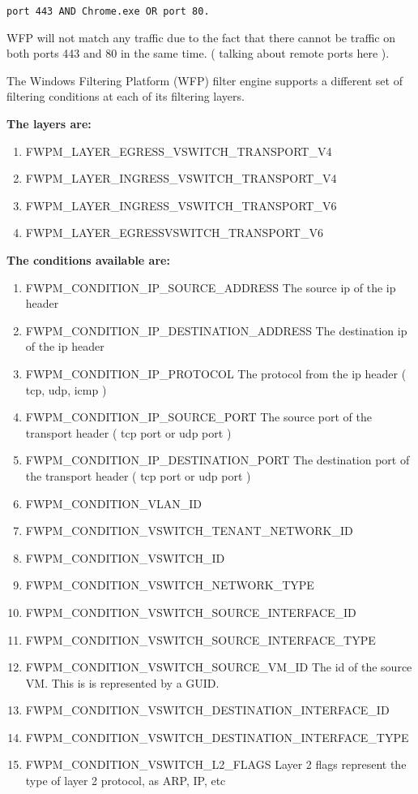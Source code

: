 \begin{lstlisting}
port 443 AND Chrome.exe OR port 80.
\end{lstlisting}

\vspace{5mm}
WFP will not match any traffic due to the fact that there cannot be traffic on both ports 443 and 80 in the same time. ( talking about remote ports here ).
\vspace{5mm}

The Windows Filtering Platform (WFP) filter engine supports a different set of filtering conditions at each of its filtering layers.

\vspace{5mm}

\textbf{The layers are: }
\vspace{5mm}
\begin{enumerate}
\item FWPM\_LAYER\_EGRESS\_VSWITCH\_TRANSPORT\_V4
\item FWPM\_LAYER\_INGRESS\_VSWITCH\_TRANSPORT\_V4
\item FWPM\_LAYER\_INGRESS\_VSWITCH\_TRANSPORT\_V6
\item FWPM\_LAYER\_EGRESSVSWITCH\_TRANSPORT\_V6
\end{enumerate}
\vspace{5mm}
\textbf{The conditions available are:}
\vspace{5mm}
\begin{enumerate}
\item FWPM\_CONDITION\_IP\_SOURCE\_ADDRESS
The source ip of the ip header
\item FWPM\_CONDITION\_IP\_DESTINATION\_ADDRESS
The destination ip of the ip header
\item FWPM\_CONDITION\_IP\_PROTOCOL
The protocol from the ip header ( tcp, udp, icmp )
\item FWPM\_CONDITION\_IP\_SOURCE\_PORT
The source port of the transport header ( tcp port or udp port )
\item FWPM\_CONDITION\_IP\_DESTINATION\_PORT
The destination port of the transport header ( tcp port or udp port )
\item FWPM\_CONDITION\_VLAN\_ID
\item FWPM\_CONDITION\_VSWITCH\_TENANT\_NETWORK\_ID
\item FWPM\_CONDITION\_VSWITCH\_ID
\item FWPM\_CONDITION\_VSWITCH\_NETWORK\_TYPE
\item FWPM\_CONDITION\_VSWITCH\_SOURCE\_INTERFACE\_ID
\item FWPM\_CONDITION\_VSWITCH\_SOURCE\_INTERFACE\_TYPE
\item FWPM\_CONDITION\_VSWITCH\_SOURCE\_VM\_ID
The id of the source VM. This is is represented by a GUID.
\item FWPM\_CONDITION\_VSWITCH\_DESTINATION\_INTERFACE\_ID
\item FWPM\_CONDITION\_VSWITCH\_DESTINATION\_INTERFACE\_TYPE
\item FWPM\_CONDITION\_VSWITCH\_L2\_FLAGS
Layer 2 flags represent the type of layer 2 protocol, as ARP, IP, etc
\end{enumerate}


